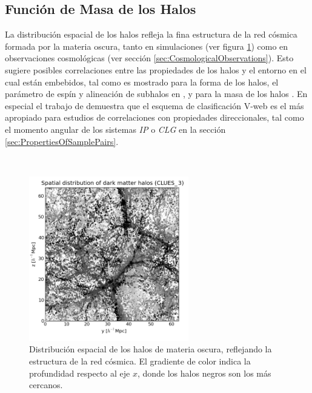 	\subsection{Función de Masa de los Halos}
	\label{subsec:Halos_Properties}


La distribución espacial de los halos refleja la fina estructura de la red 
cósmica formada por la materia oscura, tanto en simulaciones (ver figura 
\ref{fig:Halos_Web}) como en observaciones cosmológicas (ver sección 
\ref{sec:CosmologicalObservations}). Esto sugiere posibles correlaciones 
entre las propiedades de los halos y el entorno en el cual están embebidos, 
tal como es mostrado para la forma de los halos, el parámetro de espín y 
alineación de subhalos en \cite{libeskind2013}, y para la masa de los halos 
\cite{lemson1999}. En especial el trabajo de \cite{libeskind2013} demuestra 
que el esquema de clasificación V-web es el más apropiado para estudios de 
correlaciones con propiedades direccionales, tal como el momento angular de 
los sistemas \textit{IP} o \textit{CLG} en la sección
\ref{sec:PropertiesOfSamplePairs}.

\
\begin{figure}[htbp]
	\centering
	\includegraphics[width=0.62\textwidth]
	{./figures/3_nbody_simulations/Halos_Spatial_Distribution(CLUES_16953).png}

	\caption{\small{Distribución espacial de los halos de materia oscura, 
	reflejando la estructura de la red cósmica. El gradiente de color 
	indica la profundidad respecto al eje $x$, donde los halos negros son 
	los más cercanos.}}
	
	\label{fig:Halos_Web}
\end{figure}


